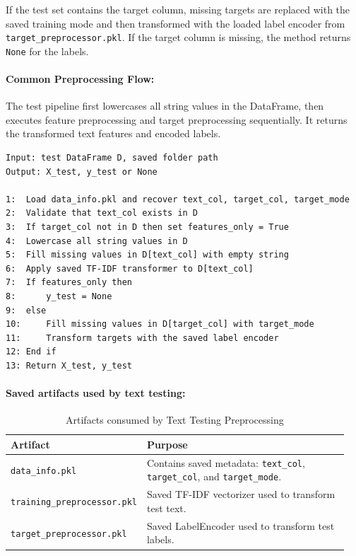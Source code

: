If the test set contains the target column, missing targets are replaced with the saved training mode and then transformed with the loaded label encoder from \texttt{target\_preprocessor.pkl}. If the target column is missing, the method returns \texttt{None} for the labels.
\vspace{1cm}
\paragraph{Common Preprocessing Flow:}\par

The test pipeline first lowercases all string values in the DataFrame, then executes feature preprocessing and target preprocessing sequentially. It returns the transformed text features and encoded labels.
\vspace{0.5cm}

\begin{lstlisting}[style=algostyle,caption={Text Testing Preprocessing Pipeline},label={alg:text_testing_pipeline}]
Input: test DataFrame D, saved folder path
Output: X_test, y_test or None

1:  Load data_info.pkl and recover text_col, target_col, target_mode
2:  Validate that text_col exists in D
3:  If target_col not in D then set features_only = True
4:  Lowercase all string values in D
5:  Fill missing values in D[text_col] with empty string
6:  Apply saved TF-IDF transformer to D[text_col]
7:  If features_only then
8:      y_test = None
9:  else
10:     Fill missing values in D[target_col] with target_mode
11:     Transform targets with the saved label encoder
12: End if
13: Return X_test, y_test
\end{lstlisting}
\vspace{1cm}
\paragraph{Saved artifacts used by text testing:}\par

\begin{table}[!htbp]
\centering
\small
\renewcommand{\arraystretch}{1.15}
\setlength{\tabcolsep}{4pt}
\caption{Artifacts consumed by Text Testing Preprocessing}
\begin{tabular}{p{0.30\linewidth}p{0.65\linewidth}}
\toprule
\textbf{Artifact} & \textbf{Purpose}\\
\midrule
\texttt{data\_info.pkl} & Contains saved metadata: \texttt{text\_col}, \texttt{target\_col}, and \texttt{target\_mode}.\\
\texttt{training\_preprocessor.pkl} & Saved TF-IDF vectorizer used to transform test text.\\
\texttt{target\_preprocessor.pkl} & Saved LabelEncoder used to transform test labels.\\
\bottomrule
\end{tabular}
\end{table}
